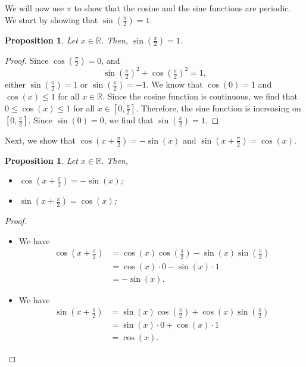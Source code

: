 \documentclass[a4paper, openany]{memoir}
\theoremstyle{definition}
\theoremstyle{plain}
\newtheorem{proposition}[definition]{Proposition}
\begin{document}
We will now use $\pi$ to show that the cosine and the sine functions are periodic. We start by showing that $\sin (\frac{\pi}{2}) = 1$.
\begin{proposition}
Let $x \in \mathbb{R}$. Then, $\sin(\frac{\pi}{2}) = 1$.
\end{proposition}
\begin{proof}
Since $\cos (\frac{\pi}{2}) = 0$, and
\[\sin(\tfrac{\pi}{2})^2 + \cos(\tfrac{\pi}{2})^2 = 1,\]
either $\sin (\frac{\pi}{2}) = 1$ or $\sin (\frac{\pi}{2}) = -1$. We know that $\cos (0) = 1$ and $\cos (x) \leqslant 1$ for all $x \in \mathbb{R}$. Since the cosine function is continuous, we find that $0 \leqslant \cos(x) \leqslant 1$ for all $x \in [0, \frac{\pi}{2}]$. Therefore, the sine function is increasing on $[0, \frac{\pi}{2}]$. Since $\sin (0) = 0$, we find that $\sin (\frac{\pi}{2}) = 1$.
\end{proof}
\noindent Next, we show that $\cos (x + \frac{\pi}{2}) = -\sin (x)$ and $\sin (x + \frac{\pi}{2}) = \cos (x)$.
\begin{proposition}
Let $x \in \mathbb{R}$. Then, 
\begin{itemize}
    \item $\cos(x + \frac{\pi}{2}) = -\sin (x)$;
    \item $\sin(x + \frac{\pi}{2}) = \cos (x)$;
\end{itemize}
\end{proposition}
\begin{proof}
\hspace*{0pt}
\begin{itemize}
    \item We have
    \begin{align*}
        \cos (x + \tfrac{\pi}{2}) &= \cos (x) \cos (\tfrac{\pi}{2}) - \sin (x) \sin (\tfrac{\pi}{2}) \\
        &= \cos(x) \cdot 0 - \sin(x) \cdot 1 \\
        &= -\sin (x).
    \end{align*}
    
    \item We have
    \begin{align*}
        \sin (x + \tfrac{\pi}{2}) &= \sin (x) \cos (\tfrac{\pi}{2}) + \cos (x) \sin (\tfrac{\pi}{2}) \\
        &= \sin (x) \cdot 0 + \cos (x) \cdot 1 \\
        &= \cos (x).
    \end{align*}
\end{itemize}
\end{proof}
\end{document}
